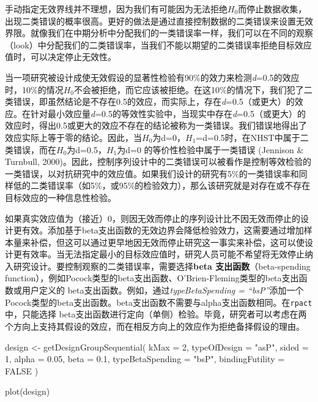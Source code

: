 \documentclass[
  letterpaper,
  DIV=11,
  numbers=noendperiod]{scrreprt}
\newenvironment{Shaded}{\begin{snugshade}}{\end{snugshade}}
\newcommand{\AttributeTok}[1]{\textcolor[rgb]{0.40,0.45,0.13}{#1}}
\newcommand{\ConstantTok}[1]{\textcolor[rgb]{0.56,0.35,0.01}{#1}}
\newcommand{\DecValTok}[1]{\textcolor[rgb]{0.68,0.00,0.00}{#1}}
\newcommand{\FloatTok}[1]{\textcolor[rgb]{0.68,0.00,0.00}{#1}}
\newcommand{\FunctionTok}[1]{\textcolor[rgb]{0.28,0.35,0.67}{#1}}
\newcommand{\NormalTok}[1]{\textcolor[rgb]{0.00,0.23,0.31}{#1}}
\newcommand{\OtherTok}[1]{\textcolor[rgb]{0.00,0.23,0.31}{#1}}
\newcommand{\StringTok}[1]{\textcolor[rgb]{0.13,0.47,0.30}{#1}}
\begin{document}
手动指定无效界线并不理想，因为我们有可能因为无法拒绝\(H_0\)而停止数据收集，出现二类错误的概率很高。更好的做法是通过直接控制数据的二类错误来设置无效界限。就像我们在中期分析中分配我们的一类错误率一样，我们可以在不同的观察（look）中分配我们的二类错误率，当我们不能以期望的二类错误率拒绝目标效应值时，可以决定停止无效性。

当一项研究被设计成使无效假设的显著性检验有90\%的效力来检测\emph{d}=0.5的效应时，10\%的情况\(H_0\)不会被拒绝，而它应该被拒绝。在这10\%的情况下，我们犯了二类错误，即虽然结论是不存在0.5的效应，而实际上，存在\emph{d}=0.5（或更大）的效应。在针对最小效应量\emph{d}=0.5的等效性实验中，当现实中存在\emph{d}=0.5（或更大）的效应时，得出0.5或更大的效应不存在的结论被称为一类错误。我们错误地得出了效应实际上等于零的结论。因此，当\(H_0\)为d=0，\(H_1\)=d=0.5时，在NHST中属于二类错误，而在\(H_0\)为d=0.5，\(H_1\)为d=0
的等价性检验中属于一类错误 (Jennison \& Turnbull,
2000)。因此，控制序列设计中的二类错误可以被看作是控制等效检验的一类错误，以对抗研究中的效应值。如果我们设计的研究有5\%的一类错误率和同样低的二类错误率（如5\%，或95\%的检验效力），那么该研究就是对存在或不存在目标效应的一种信息性检验。

如果真实效应值为（接近）0，则因无效而停止的序列设计比不因无效而停止的设计更有效。添加基于beta支出函数的无效边界会降低检验效力，这需要通过增加样本量来补偿，但这可以通过更早地因无效而停止研究这一事实来补偿，这可以使设计更有效率。当无法指定最小的目标效应值时，研究人员可能不希望将无效停止纳入研究设计。要控制观察的二类错误率，需要选择\textbf{beta
支出函数}（beta-spending
function），例如Pocock类型的beta支出函数、O'Brien-Fleming类型的beta支出函数或用户定义的
beta支出函数。例如，通过\emph{typeBetaSpending =
``bsP''}添加一个Pocock类型的beta支出函数。beta支出函数不需要与alpha支出函数相同。在\texttt{rpact}中，只能选择
beta支出函数进行定向（单侧）检验。毕竟，研究者可以考虑在两个方向上支持其假设的效应，而在相反方向上的效应作为拒绝备择假设的理由。

\begin{Shaded}
\begin{Highlighting}[]
\NormalTok{design }\OtherTok{\textless{}{-}} \FunctionTok{getDesignGroupSequential}\NormalTok{(}
  \AttributeTok{kMax =} \DecValTok{2}\NormalTok{,}
  \AttributeTok{typeOfDesign =} \StringTok{"asP"}\NormalTok{,}
  \AttributeTok{sided =} \DecValTok{1}\NormalTok{,}
  \AttributeTok{alpha =} \FloatTok{0.05}\NormalTok{,}
  \AttributeTok{beta =} \FloatTok{0.1}\NormalTok{,}
  \AttributeTok{typeBetaSpending =} \StringTok{"bsP"}\NormalTok{,}
  \AttributeTok{bindingFutility =} \ConstantTok{FALSE}
\NormalTok{  )}

\FunctionTok{plot}\NormalTok{(design)}
\end{Highlighting}
\end{Shaded}
\end{document}
